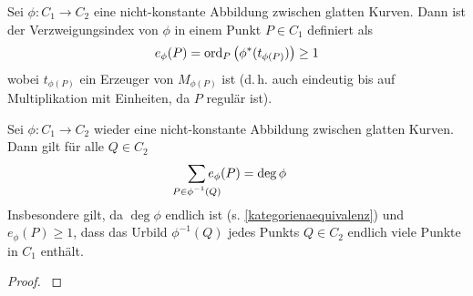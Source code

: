 \begin{Definition}[Verzweigungsindex]
  Sei $\phi\colon C_1\to C_2$ eine nicht-konstante Abbildung zwischen
  glatten Kurven.
  Dann ist der Verzweigungsindex von $\phi$ in einem Punkt
  $P\in C_1$ definiert als
  \begin{gather*}
    e_\phi(P) = \operatorname{ord}_P \left( \phi^*(t_{\phi(P)}) \right) \geq 1
  \end{gather*}
  wobei $t_{\phi(P)}$ ein Erzeuger von $M_{\phi(P)}$ ist (d.\,h. auch
  eindeutig bis auf Multiplikation mit Einheiten, da $P$ regulär ist).
\end{Definition}

\begin{Satz}
  Sei $\phi\colon C_1\to C_2$ wieder eine nicht-konstante Abbildung
  zwischen glatten Kurven. Dann gilt für alle $Q\in C_2$
  \begin{gather*}
    \sum_{\mathclap{P\in\phi^{-1}(Q)}} e_\phi(P) = \deg\phi
  \end{gather*}
  Insbesondere gilt, da $\deg\phi$ endlich ist
  (s. \ref{kategorienaequivalenz}) und $e_\phi(P)\geq 1$,
  dass das Urbild $\phi^{-1}(Q)$ jedes Punkts $Q\in C_2$
  endlich viele Punkte in $C_1$ enthält.
  \begin{proof}
    \cite[siehe][Proposition 2.6 (a)]{silverman}
  \end{proof}
\end{Satz}


